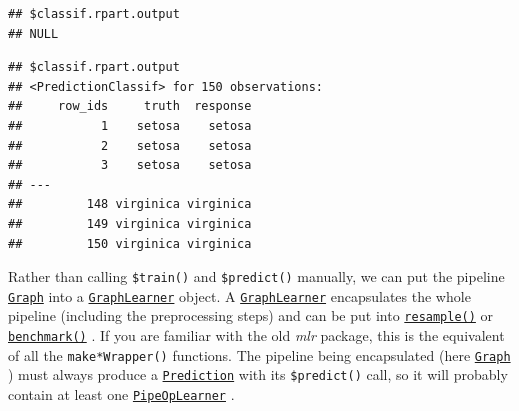 \documentclass[
]{scrbook}
\newenvironment{Shaded}{\begin{snugshade}}{\end{snugshade}}
\newcommand{\FunctionTok}[1]{\textcolor[rgb]{0.00,0.00,0.00}{#1}}
\newcommand{\NormalTok}[1]{#1}
\newcommand{\OtherTok}[1]{\textcolor[rgb]{0.56,0.35,0.01}{#1}}
\newcommand{\SpecialCharTok}[1]{\textcolor[rgb]{0.00,0.00,0.00}{#1}}
\newcommand{\StringTok}[1]{\textcolor[rgb]{0.31,0.60,0.02}{#1}}
\renewenvironment{Shaded} {\begin{snugshade}\small} {\end{snugshade}}
\begin{document}
\begin{Shaded}
\end{Shaded}

\begin{verbatim}
## $classif.rpart.output
## NULL
\end{verbatim}

\begin{Shaded}
\end{Shaded}

\begin{verbatim}
## $classif.rpart.output
## <PredictionClassif> for 150 observations:
##     row_ids     truth  response
##           1    setosa    setosa
##           2    setosa    setosa
##           3    setosa    setosa
## ---                            
##         148 virginica virginica
##         149 virginica virginica
##         150 virginica virginica
\end{verbatim}

Rather than calling \texttt{\$train()} and \texttt{\$predict()} manually, we can put the pipeline \href{https://mlr3pipelines.mlr-org.com/reference/Graph.html}{\texttt{Graph}} into a \href{https://mlr3pipelines.mlr-org.com/reference/mlr_learners_graph.html}{\texttt{GraphLearner}} object.
A \href{https://mlr3pipelines.mlr-org.com/reference/mlr_learners_graph.html}{\texttt{GraphLearner}} encapsulates the whole pipeline (including the preprocessing steps) and can be put into \href{https://mlr3.mlr-org.com/reference/resample.html}{\texttt{resample()}} or \href{https://mlr3.mlr-org.com/reference/benchmark.html}{\texttt{benchmark()}} .
If you are familiar with the old \emph{mlr} package, this is the equivalent of all the \texttt{make*Wrapper()} functions.
The pipeline being encapsulated (here \href{https://mlr3pipelines.mlr-org.com/reference/Graph.html}{\texttt{Graph}} ) must always produce a \href{https://mlr3.mlr-org.com/reference/Prediction.html}{\texttt{Prediction}} with its \texttt{\$predict()} call, so it will probably contain at least one \href{https://mlr3pipelines.mlr-org.com/reference/mlr_pipeops_learner.html}{\texttt{PipeOpLearner}} .
\end{document}
